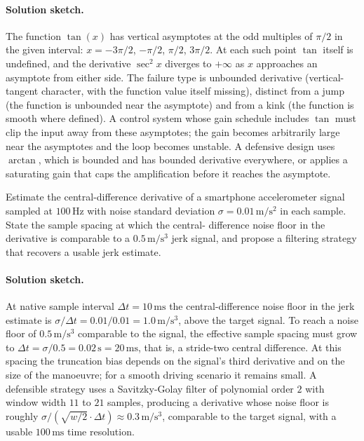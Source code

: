 \paragraph{Solution sketch.}
The function $\tan(x)$ has vertical asymptotes at the odd
multiples of $\pi/2$ in the given interval: $x = -3\pi/2$,
$-\pi/2$, $\pi/2$, $3\pi/2$. At each such point $\tan$ itself is
undefined, and the derivative $\sec^{2} x$ diverges to
$+\infty$ as $x$ approaches an asymptote from either side. The
failure type is unbounded derivative (vertical-tangent character,
with the function value itself missing), distinct from a jump
(the function is unbounded near the asymptote) and from a kink
(the function is smooth where defined). A control system whose
gain schedule includes $\tan$ must clip the input away from
these asymptotes; the gain becomes arbitrarily large near the
asymptotes and the loop becomes unstable. A defensive design uses
$\arctan$, which is bounded and has bounded derivative
everywhere, or applies a saturating gain that caps the
amplification before it reaches the asymptote.

\begin{exercise}
Estimate the central-difference derivative of a smartphone
accelerometer signal sampled at $100\,\si{\hertz}$ with noise
standard deviation $\sigma = 0.01\,\si{\meter\per\second\squared}$
in each sample. State the sample spacing at which the central-
difference noise floor in the derivative is comparable to a
$0.5\,\si{\meter\per\second\cubed}$ jerk signal, and propose a
filtering strategy that recovers a usable jerk estimate.
\end{exercise}

\paragraph{Solution sketch.}
At native sample interval $\Delta t = 10 \,\si{\milli\second}$
the central-difference noise floor in the jerk estimate is
$\sigma / \Delta t = 0.01 / 0.01 = 1.0 \,\si{\meter\per
\second\cubed}$, above the target signal. To reach a noise floor
of $0.5 \,\si{\meter\per\second\cubed}$ comparable to the
signal, the effective sample spacing must grow to $\Delta t =
\sigma / 0.5 = 0.02 \,\si{\second} = 20 \,\si{\milli\second}$,
that is, a stride-two central difference. At this spacing the
truncation bias depends on the signal's third derivative and on
the size of the manoeuvre; for a smooth driving scenario it
remains small. A defensible strategy uses a Savitzky-Golay
filter of polynomial order $2$ with window width $11$ to $21$
samples, producing a derivative whose noise floor is roughly
$\sigma / (\sqrt{w/2} \cdot \Delta t) \approx 0.3 \,\si{
\meter\per\second\cubed}$, comparable to the target signal,
with a usable $100 \,\si{\milli\second}$ time resolution.
